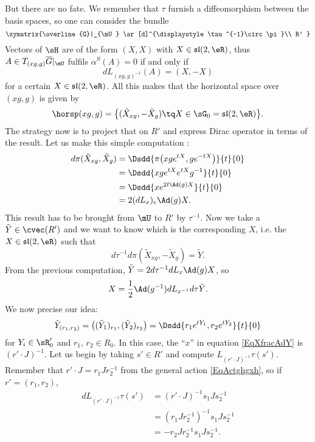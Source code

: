 But there are no fate. We remember that $\tau$ furnish a diffeomorphism between the basis spaces, so one can consider the bundle 
\[ 
  \xymatrix{%
   \overline{G}|_{\mU} \ar[d]^{\displaystyle\tau^{-1}\circ\pi}\\        
   R'
}
\]
Vectors of $\sH$ are of the form $(X,X)$ with $X\in\mathfrak{sl}(2,\eR)$, thus $A\in T_{(xg,g)}\overline{G}|_{\mU}$ fulfils $\alpha^{S}(A)=0$ if and only if
\[ 
  dL_{(xg,g)^{-1}}(A)=(X,-X)
\]
for a certain $X\in \mathfrak{sl}(2,\eR)$. All this makes that the horizontal space over $(xg,g)$ is given by
\begin{equation}
\horsp(xg,g)=\big\{ (\tilde X_{xg},-\tilde X_{g})\tq X\in \sG_0=\mathfrak{sl}(2,\eR) \big\}.
\end{equation}
The strategy now is to project that on $R'$ and express Dirac operator in terms of the result. Let us make this simple computation :
\begin{align*}
d\pi(\tilde X_{xg},\tilde X_{g})&=\Dsdd{ \pi\big( xg e^{tX},g e^{-tX} \big) }{t}{0}\\
        &=\Dsdd{ xg e^{tX} e^{tX}g^{-1} }{t}{0}\\
        &=\Dsdd{ x e^{2t\Ad(g)X} }{t}{0}\\
        &=2(dL_{x})_{e}\Ad(g)X.
\end{align*}
This result has to be brought from $\mU$ to $R'$ by $\tau^{-1}$. Now we take a $\tilde Y\in\cvec(R')$ and we want to know which is the corresponding $X$, i.e. the $X\in\mathfrak{sl}(2,\eR)$ such that
\[ 
  d\tau^{-1}d\pi(\tilde X_{xg},-\tilde X_{g})=\tilde Y.
\]
From the previous computation, $\tilde Y=2d\tau^{-1}dL_{x}\Ad(g)X$, so
\begin{equation}  \label{EqXfracAdY}
  X=\frac{ 1 }{2}\Ad(g^{-1})dL_{x^{-1}}d\tau\tilde Y. 
\end{equation}
We now precise our idea: 
\begin{equation}   \label{EqtildeYrunrdeux}
  \tilde Y_{(r_{1},r_2)}=\big(    (\tilde Y_{1})_{r_1},(\tilde Y_{2})_{r_2}   \big)=\Dsdd{ r_1 e^{tY_{1}},r_2 e^{tY_{2}} }{t}{0}
\end{equation}
for $Y_{i}\in\sR'_{0}$ and $r_1$, $r_2\in R_{0}$. In this case, the ``$x$'' in equation \eqref{EqXfracAdY} is $(r'\cdot J)^{-1}$. Let us begin by taking $s'\in R'$ and compute $L_{(r'\cdot J)^{-1}}\tau(s')$. Remember that $r'\cdot J=r_1Jr_2^{-1}$ from the general action \eqref{EqActghgxh}, so if $r'=(r_1,r_2)$,
\begin{align*}
  dL_{(r'\cdot J)^{-1}}\tau(s')&=(r'\cdot J)^{-1}s_1 Js_2^{-1}\\
        &=(r_1Jr_2^{-1})^{-1}s_1Js_2^{-1}\\
        &=-r_2Jr_2^{-1}s_1Js_2^{-1}.
\end{align*}
